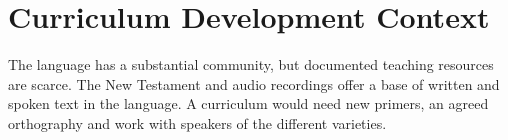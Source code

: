 \documentclass[12pt]{article}
\begin{document}
\section{Curriculum Development Context}
The language has a substantial community, but documented teaching resources are scarce. The New Testament and audio recordings offer a base of written and spoken text in the language. A curriculum would need new primers, an agreed orthography and work with speakers of the different varieties.
\end{document}

